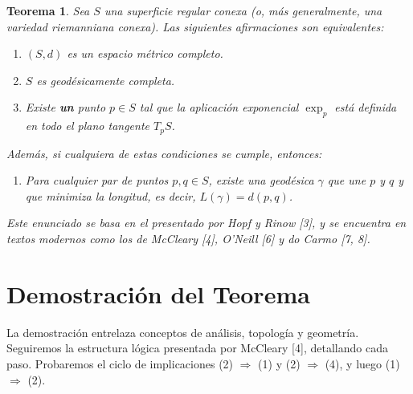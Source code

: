 \documentclass[12pt, a4paper]{report}
\theoremstyle{miestilo}
\newtheorem{teorema}{Teorema}[chapter]
\theoremstyle{midefinicion}
\begin{document}
\begin{teorema}
Sea $S$ una superficie regular conexa (o, más generalmente, una variedad riemanniana conexa). Las siguientes afirmaciones son equivalentes:
\begin{enumerate}
    \item[ (1) ] $(S,d)$ es un espacio métrico completo.
    \item[ (2) ] $S$ es geodésicamente completa.
    \item[ (3) ] Existe \textbf{un} punto $p \in S$ tal que la aplicación exponencial $\exp_p$ está definida en todo el plano tangente $T_pS$.
\end{enumerate}
Además, si cualquiera de estas condiciones se cumple, entonces:
\begin{enumerate}
    \item[ (4) ] Para cualquier par de puntos $p, q \in S$, existe una geodésica $\gamma$ que une $p$ y $q$ y que minimiza la longitud, es decir, $L(\gamma) = d(p,q)$.
\end{enumerate}
Este enunciado se basa en el presentado por Hopf y Rinow [3], y se encuentra en textos modernos como los de McCleary [4], O'Neill [6] y do Carmo [7, 8].
\end{teorema}

\section{Demostración del Teorema}

La demostración entrelaza conceptos de análisis, topología y geometría. Seguiremos la estructura lógica presentada por McCleary [4], detallando cada paso. Probaremos el ciclo de implicaciones (2) $\Rightarrow$ (1) y (2) $\Rightarrow$ (4), y luego (1) $\Rightarrow$ (2).
\end{document}
